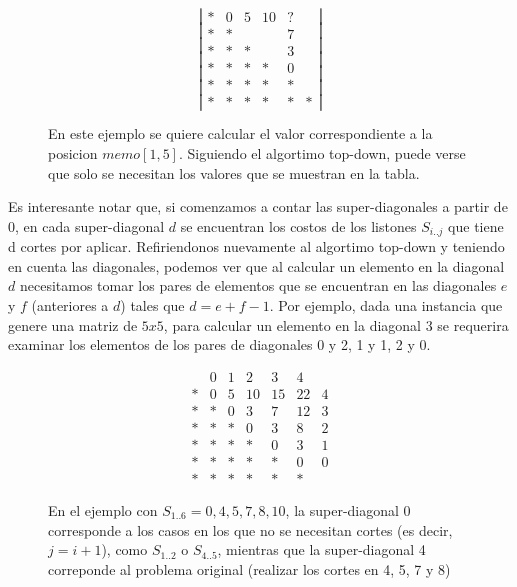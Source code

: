 \begin{figure}[h!]
	\begin{center}
		\begin{minipage}[c]{\figurewidth}
			\begin{center}   
\[ \left| \begin{array}{cccccc}
* & 0 & 5 & 10 & ? &  \\
* & * &   &    & 7 &   \\
* & * & * &    & 3 &   \\
* & * & * & *  & 0 &   \\
* & * & * & *  & * &   \\
* & * & * & *  & * & * \end{array} \right|\]
  \caption{En este ejemplo se quiere calcular el valor correspondiente a la posicion $memo[1,5]$. Siguiendo el algortimo top-down, puede verse que solo se necesitan los valores que se muestran en la tabla.}
			\end{center}
		\end{minipage}
	\end{center}
\end{figure}

Es interesante notar que, si comenzamos a contar las super-diagonales a partir de 0, en cada super-diagonal $d$ se encuentran 
los costos de los listones $S_{i..j}$ que tiene d cortes por aplicar. Refiriendonos nuevamente al algortimo top-down y 
teniendo en cuenta las diagonales, podemos ver que al calcular un elemento en la diagonal $d$ necesitamos tomar los pares 
de elementos que se encuentran en las diagonales $e$ y $f$ (anteriores a $d$) tales que $d = e + f - 1$. 
Por ejemplo, dada una instancia que genere una matriz de $5x5$, para calcular un elemento en la diagonal $3$ se requerira 
examinar los elementos de los pares de diagonales 0 y 2, 1  y 1, 2 y 0.
\\

\begin{figure}[h!]
	\begin{center}
		\begin{minipage}[c]{\figurewidth}
			\begin{center}   
\[ \begin{array}{cccccc|c}

  & 0 & 1 & 2  & 3  & 4  & \\
\hline
* & 0 & 5 & 10 & 15 & 22 & 4\\
* & * & 0 & 3 & 7 & 12 & 3\\
* & * & * & 0  & 3 & 8 & 2\\
* & * & * & *  & 0 & 3& 1\\
* & * & * & *  & * & 0& 0\\
* & * & * & *  & * & *& \end{array} \]
  \caption{
   En el ejemplo con $S_{1..6} = {0,4,5,7,8,10}$, la 
super-diagonal 0 corresponde a los casos en los que no se necesitan cortes (es decir, $j = i+1$), como $S_{1..2}$ o $S_{4..5}$, mientras que la 
super-diagonal 4 correponde al problema original (realizar los cortes en 4, 5, 7 y 8)
  }
			\end{center}
		\end{minipage}
	\end{center}
\end{figure}

